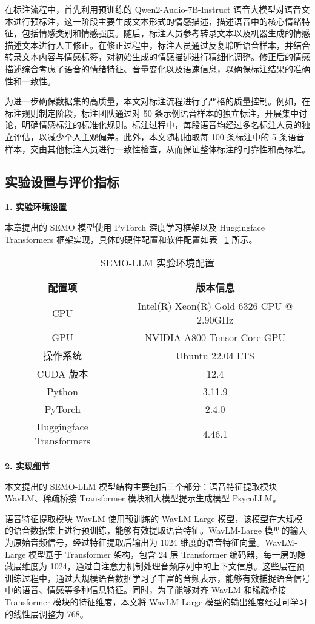 在标注流程中，首先利用预训练的 Qwen2-Audio-7B-Instruct 语音大模型对语音文本进行预标注，这一阶段主要生成文本形式的情感描述，描述语音中的核心情绪特征，包括情感类别和情感强度。随后，标注人员参考转录文本以及机器生成的情感描述文本进行人工修正。在修正过程中，标注人员通过反复聆听语音样本，并结合转录文本内容与情感标签，对初始生成的情感描述进行精细化调整。修正后的情感描述综合考虑了语音的情绪特征、音量变化以及语速信息，以确保标注结果的准确性和一致性。

为进一步确保数据集的高质量，本文对标注流程进行了严格的质量控制。例如，在标注规则制定阶段，标注团队通过对 50 条示例语音样本的独立标注，开展集中讨论，明确情感标注的标准化规则。标注过程中，每段语音均经过多名标注人员的独立评估，以减少个人主观偏差。此外，本文随机抽取每 100 条标注中的 5 条语音样本，交由其他标注人员进行一致性检查，从而保证整体标注的可靠性和高标准。

\subsection{实验设置与评价指标}

\textbf{1. 实验环境设置}

本章提出的 SEMO 模型使用 PyTorch 深度学习框架以及 Huggingface Transformers 框架实现，具体的硬件配置和软件配置如表 ~\ref{tab:work2-实验环境配置} 所示。

\begin{table}
  \centering
  \caption{SEMO-LLM 实验环境配置}
  \label{tab:work2-实验环境配置}
  \begin{tabular}{cc}
    \toprule
    配置项 & 版本信息 \\
    \midrule
    CPU & Intel(R) Xeon(R) Gold 6326 CPU @ 2.90GHz \\
    GPU & NVIDIA A800 Tensor Core GPU \\
    操作系统 & Ubuntu 22.04 LTS \\
    CUDA 版本 & 12.4 \\
    Python & 3.11.9 \\
    PyTorch & 2.4.0 \\
    Huggingface Transformers & 4.46.1 \\
    \bottomrule
  \end{tabular}
\end{table}

\textbf{2. 实现细节}

本文提出的 SEMO-LLM 模型结构主要包括三个部分：语音特征提取模块 WavLM、稀疏桥接 Transformer 模块和大模型提示生成模型 PsycoLLM。

语音特征提取模块 WavLM 使用预训练的 WavLM-Large 模型，该模型在大规模的语音数据集上进行预训练，能够有效提取语音特征。WavLM-Large 模型的输入为原始音频信号，经过特征提取后输出为 1024 维度的语音特征向量。WavLM-Large 模型基于 Transformer 架构，包含 24 层 Transformer 编码器，每一层的隐藏层维度为 1024，通过自注意力机制处理音频序列中的上下文信息。这些层在预训练过程中，通过大规模语音数据学习了丰富的音频表示，能够有效捕捉语音信号中的语音、情感等多种信息特征。同时，为了能够对齐 WavLM 和稀疏桥接 Transformer 模块的特征维度，本文将 WavLM-Large 模型的输出维度经过可学习的线性层调整为 768。

